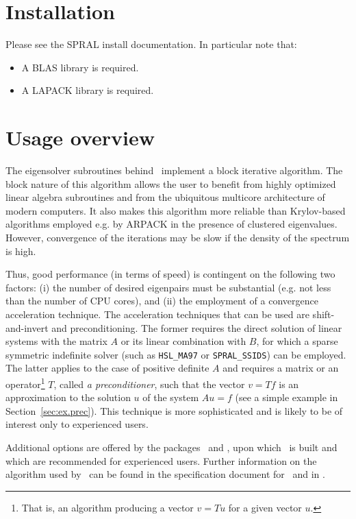 \documentclass{spral}
\begin{document}
\section{Installation}
Please see the SPRAL install documentation. In particular note that:
\begin{itemize}
   \item A BLAS library is required.
   \item A LAPACK library is required.
\end{itemize}

\section{Usage overview}

\label{sec:summary}

The eigensolver subroutines
behind \fullpackagename\
implement a block iterative algorithm.
The block nature of this algorithm allows the user
to benefit from highly optimized linear algebra subroutines
and from the ubiquitous multicore architecture
of modern computers.
It also makes this algorithm more reliable
than Krylov-based algorithms employed e.g. by ARPACK
in the presence of clustered eigenvalues.
However, convergence of the iterations may be slow
if the density of the spectrum is high.

Thus, good performance 
(in terms of speed)
is contingent on the following two factors:
(i) the number of desired
eigenpairs must be substantial
(e.g. not less than the number of CPU cores),
and
(ii) the employment of a convergence acceleration technique.
The acceleration techniques that can be used 
are shift-and-invert and preconditioning.
The former requires
the direct solution of linear systems
with the matrix $A$ or its linear combination with $B$,
for which a sparse symmetric indefinite solver
(such as {\tt HSL\_MA97} or {\tt SPRAL\_SSIDS}) can be employed.
The latter applies to the case of positive definite $A$ and
requires a matrix or an operator\footnote{
That is, an algorithm producing a vector $v = T u$ for a given
vector $u$.
}
$T$, called {\em a preconditioner},
such that the vector
$v = T f$ is an approximation to the solution $u$
of the system $A u = f$
(see a simple example in Section~\ref{sec:ex.prec}).
This technique is more sophisticated
and is likely to be of interest only to experienced users.

Additional
options are offered by
the packages \advanced\ and \engine,
upon which \fullpackagename\ is built
and which are recommended for experienced users.
Further information on the algorithm used by
\fullpackagename\ can be found in the
specification document for \engine\
and in \report.
\end{document}
